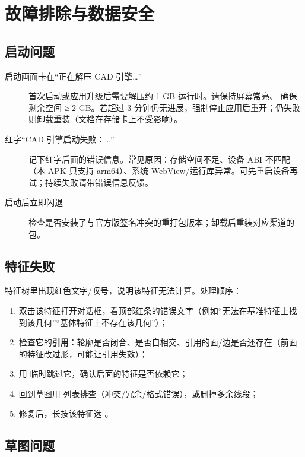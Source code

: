 \chapter{故障排除与数据安全}

\section{启动问题}

\begin{description}
  \item[启动画面卡在“正在解压 CAD 引擎…”] 首次启动或应用升级后需要解压约 1 GB 运行时。请保持屏幕常亮、
        确保剩余空间 ≥ 2 GB。若超过 3 分钟仍无进展，强制停止应用后重开；仍失败则卸载重装（文档在存储卡上不受影响）。
  \item[红字“CAD 引擎启动失败：…”] 记下红字后面的错误信息。常见原因：存储空间不足、设备 ABI 不匹配
        （本 APK 只支持 arm64）、系统 WebView/运行库异常。可先重启设备再试；持续失败请带错误信息反馈。
  \item[启动后立即闪退] 检查是否安装了与官方版签名冲突的重打包版本；卸载后重装对应渠道的包。
\end{description}

\section{特征失败}

特征树里出现红色文字/叹号，说明该特征无法计算。处理顺序：

\begin{enumerate}
  \item 双击该特征打开对话框，看顶部红条的错误文字（例如“无法在基准特征上找到该几何”“基体特征上不存在该几何”）；
  \item 检查它的\textbf{引用}：轮廓是否闭合、是否自相交、引用的面/边是否还存在（前面的特征改过形，可能让引用失效）；
  \item 用  临时跳过它，确认后面的特征是否依赖它；
  \item 回到草图用  列表排查（冲突/冗余/格式错误），或删掉多余线段；
  \item 修复后，长按该特征选 。
\end{enumerate}

\section{草图问题}

